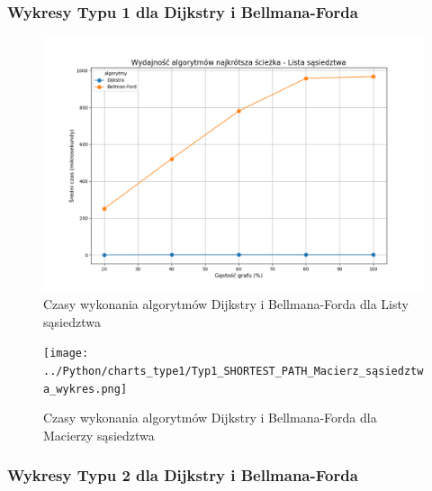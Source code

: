 \documentclass{article}
\begin{document}
\subsubsection{Wykresy Typu 1 dla Dijkstry i Bellmana-Forda}

\begin{figure}[H]
    \centering
    \includegraphics[scale=0.5]{../Python/charts_type1/Typ1_SHORTEST_PATH_Lista_sąsiedztwa_wykres.png}
    \caption{Czasy wykonania algorytmów Dijkstry i Bellmana-Forda dla Listy sąsiedztwa}
\end{figure}
\begin{figure}[H]
    \centering
    \texttt{[image: ../Python/charts\_type1/Typ1\_SHORTEST\_PATH\_Macierz\_sąsiedztwa\_wykres.png]}
    \caption{Czasy wykonania algorytmów Dijkstry i Bellmana-Forda dla Macierzy sąsiedztwa}
\end{figure}

\subsubsection{Wykresy Typu 2 dla Dijkstry i Bellmana-Forda}
\end{document}
